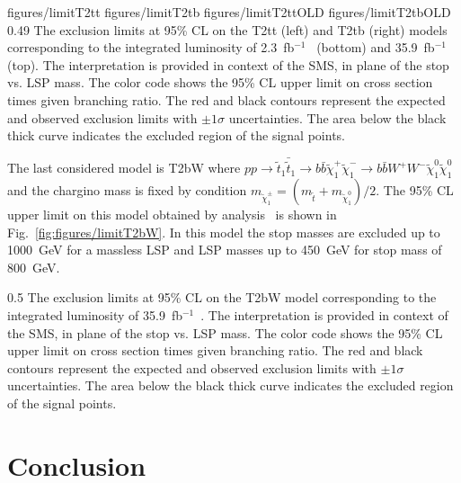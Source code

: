                  {figures/limitT2tt} %
                 {figures/limitT2tb} %
                 {figures/limitT2ttOLD} %
                 {figures/limitT2tbOLD} %
                 {0.49}       %
                 { The exclusion limits at 95\% CL on the T2tt (left) and T2tb (right) models corresponding to the integrated luminosity of 2.3~fb$^{-1}$~\cite{Sirunyan:2016jpr} (bottom) and   35.9~fb$^{-1}$ ~\cite{Sirunyan:2017xse} (top). The interpretation is provided in context of the SMS, in plane of the stop vs. LSP mass. The color code shows the 95\% CL upper limit on cross section times given branching ratio. The red and black contours represent the expected and observed exclusion limits with $\pm 1 \sigma$ uncertainties. The area below the black thick curve indicates the excluded region of the signal points.  }

The last considered model is T2bW where $ pp \to \tilde{t}_{1} \bar{\tilde{t}}_{1} \to b \bar{b} \tilde{\chi}^{+}_{1} \tilde{\chi}^{-}_{1} \to b \bar{b} W^{+} W^{-} \tilde{\chi}^{0}_{1} \tilde{\chi}^{0}_{1}$ and the chargino mass is fixed by condition $m_{\tilde{\chi}_{1}^{\pm}} = ( m_{\tilde{t}} +  m_{\tilde{\chi}_{1}^{0}} )/2$. The 95\% CL upper limit on this model obtained by analysis~\cite{Sirunyan:2017xse} is shown in Fig.~\ref{fig:figures/limitT2bW}. In this model the stop masses are excluded up to 1000~GeV for a massless LSP and LSP masses up to 450~GeV for stop mass of 800~GeV.

                 {0.5}       %
                 { The exclusion limits at 95\% CL on the T2bW model corresponding to the integrated luminosity of 35.9~fb$^{-1}$~\cite{Sirunyan:2017xse}. The interpretation is provided in context of the SMS, in plane of the stop vs. LSP mass. The color code shows the 95\% CL upper limit on cross section times given branching ratio. The red and black contours represent the expected and observed exclusion limits with $\pm 1 \sigma$ uncertainties. The area below the black thick curve indicates the excluded region of the signal points.  }

\section{Conclusion}

